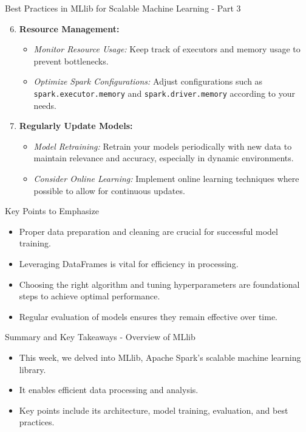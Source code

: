 \documentclass[aspectratio=169]{beamer}
\begin{document}
\begin{frame}[fragile]{Best Practices in MLlib for Scalable Machine Learning - Part 3}
    \begin{enumerate}
        \setcounter{enumi}{5} %
        \item \textbf{Resource Management:}
            \begin{itemize}
                \item \textit{Monitor Resource Usage:} Keep track of executors and memory usage to prevent bottlenecks.
                \item \textit{Optimize Spark Configurations:} Adjust configurations such as \texttt{spark.executor.memory} and \texttt{spark.driver.memory} according to your needs.
            \end{itemize}
        
        \item \textbf{Regularly Update Models:}
            \begin{itemize}
                \item \textit{Model Retraining:} Retrain your models periodically with new data to maintain relevance and accuracy, especially in dynamic environments.
                \item \textit{Consider Online Learning:} Implement online learning techniques where possible to allow for continuous updates.
            \end{itemize}
    \end{enumerate}
    
    \begin{block}{Key Points to Emphasize}
        \begin{itemize}
            \item Proper data preparation and cleaning are crucial for successful model training.
            \item Leveraging DataFrames is vital for efficiency in processing.
            \item Choosing the right algorithm and tuning hyperparameters are foundational steps to achieve optimal performance.
            \item Regular evaluation of models ensures they remain effective over time.
        \end{itemize}
    \end{block}
\end{frame}

\begin{frame}[fragile]{Summary and Key Takeaways - Overview of MLlib}
    \begin{itemize}
        \item This week, we delved into MLlib, Apache Spark's scalable machine learning library.
        \item It enables efficient data processing and analysis.
        \item Key points include its architecture, model training, evaluation, and best practices.
    \end{itemize}
\end{frame}
\end{document}
